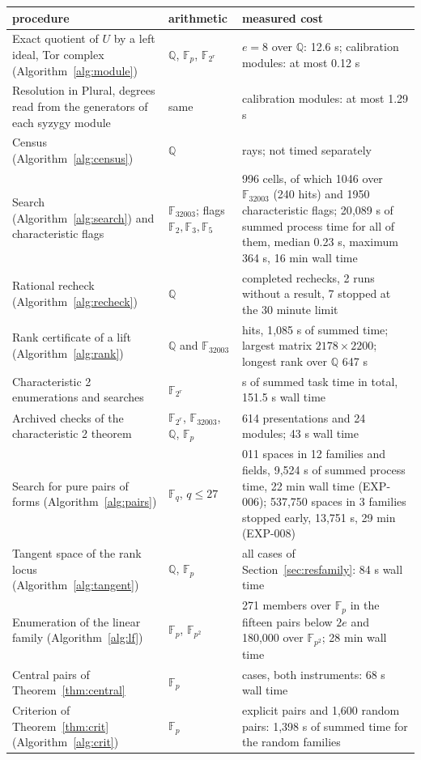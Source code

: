 \begin{tabular}{@{}>{\raggedright\arraybackslash}p{5.6cm}>{\raggedright\arraybackslash}p{2.6cm}>{\raggedright\arraybackslash}p{5.2cm}@{}}
\toprule
procedure & arithmetic & measured cost\\
\midrule
Exact quotient of $U$ by a left ideal, Tor complex (Algorithm~\ref{alg:module}) & $\mathbb{Q}$, $\mathbb{F}_p$, $\mathbb{F}_{2^r}$ & $e=8$ over $\mathbb{Q}$: 12.6 s; calibration modules: at most 0.12 s\\
Resolution in Plural, degrees read from the generators of each syzygy module & same & calibration modules: at most 1.29 s\\
Census (Algorithm~\ref{alg:census}) & $\mathbb{Q}$ & 220 rays; not timed separately\\
Search (Algorithm~\ref{alg:search}) and characteristic flags & $\mathbb{F}_{32003}$; flags $\mathbb{F}_2,\mathbb{F}_3,\mathbb{F}_5$ & 2{,}996 cells, of which 1046 over $\mathbb{F}_{32003}$ (240 hits) and 1950 characteristic flags; 20{,}089 s of summed process time for all of them, median 0.23 s, maximum 364 s, 16 min wall time\\
Rational recheck (Algorithm~\ref{alg:recheck}) & $\mathbb{Q}$ & 64 completed rechecks, 2 runs without a result, 7 stopped at the 30 minute limit\\
Rank certificate of a lift (Algorithm~\ref{alg:rank}) & $\mathbb{Q}$ and $\mathbb{F}_{32003}$ & 130 hits, 1{,}085 s of summed time; largest matrix $2178\times2200$; longest rank over $\mathbb{Q}$ 647 s\\
Characteristic 2 enumerations and searches & $\mathbb{F}_{2^r}$ & 488 s of summed task time in total, 151.5 s wall time\\
Archived checks of the characteristic 2 theorem & $\mathbb{F}_{2^r}$, $\mathbb{F}_{32003}$, $\mathbb{Q}$, $\mathbb{F}_p$ & 1{,}614 presentations and 24 modules; 43 s wall time\\
Search for pure pairs of forms (Algorithm~\ref{alg:pairs}) & $\mathbb{F}_q$, $q\le27$ & 189{,}011 spaces in 12 families and fields, 9{,}524 s of summed process time, 22 min wall time (EXP-006); 537{,}750 spaces in 3 families stopped early, 13{,}751 s, 29 min (EXP-008)\\
Tangent space of the rank locus (Algorithm~\ref{alg:tangent}) & $\mathbb{Q}$, $\mathbb{F}_p$ & all cases of Section~\ref{sec:resfamily}: 84 s wall time\\
Enumeration of the linear family (Algorithm~\ref{alg:lf}) & $\mathbb{F}_p$, $\mathbb{F}_{p^2}$ & 70{,}271 members over $\mathbb{F}_p$ in the fifteen pairs below $2e$ and 180{,}000 over $\mathbb{F}_{p^2}$; 28 min wall time\\
Central pairs of Theorem~\ref{thm:central} & $\mathbb{F}_p$ & 16 cases, both instruments: 68 s wall time\\
Criterion of Theorem~\ref{thm:crit} (Algorithm~\ref{alg:crit}) & $\mathbb{F}_p$ & 11 explicit pairs and 1{,}600 random pairs: 1{,}398 s of summed time for the random families\\
\bottomrule
\end{tabular}
